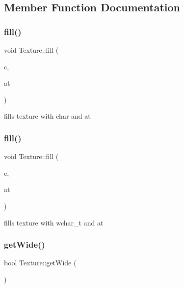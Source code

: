 \subsection{Member Function Documentation}
\mbox{\label{classsc_1_1_texture_abe2c73b9e910cd8df9a6544bf6acdbd2}} 
\subsubsection{\texorpdfstring{fill()}{fill()}\hspace{0.1cm}{\footnotesize\ttfamily [1/2]}}
{\footnotesize\ttfamily void Texture\+::fill (\begin{DoxyParamCaption}\item[{char}]{c,  }\item[{W\+O\+RD}]{at }\end{DoxyParamCaption})}



fills texture with char and at 

\mbox{\label{classsc_1_1_texture_a5df48dc70b5ffec2507c94a9af941e29}} 
\subsubsection{\texorpdfstring{fill()}{fill()}\hspace{0.1cm}{\footnotesize\ttfamily [2/2]}}
{\footnotesize\ttfamily void Texture\+::fill (\begin{DoxyParamCaption}\item[{wchar\+\_\+t}]{c,  }\item[{W\+O\+RD}]{at }\end{DoxyParamCaption})}



fills texture with wchar\+\_\+t and at 

\mbox{\label{classsc_1_1_texture_ae9df5b705a4395c9004022dead98cf19}} 
\subsubsection{\texorpdfstring{getWide()}{getWide()}}
{\footnotesize\ttfamily bool Texture\+::get\+Wide (\begin{DoxyParamCaption}{ }\end{DoxyParamCaption})}

